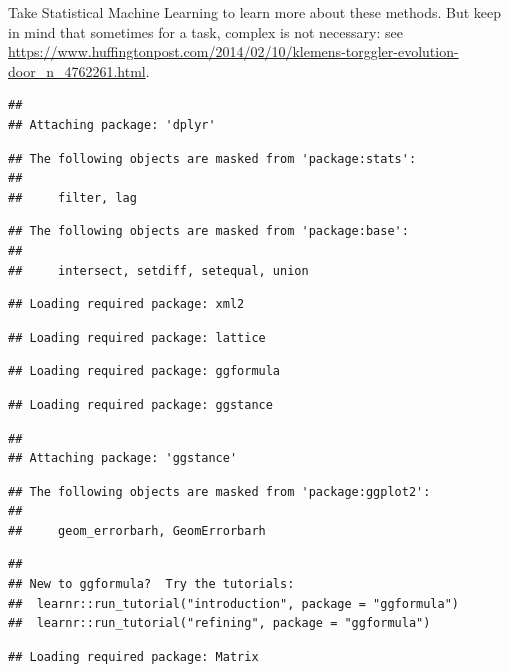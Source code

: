 \documentclass[
]{book}
\begin{document}
Take Statistical Machine Learning to learn more about these methods. But keep in mind that sometimes for a task, complex is not necessary: see \url{https://www.huffingtonpost.com/2014/02/10/klemens-torggler-evolution-door_n_4762261.html}.

\begin{verbatim}
## 
## Attaching package: 'dplyr'
\end{verbatim}

\begin{verbatim}
## The following objects are masked from 'package:stats':
## 
##     filter, lag
\end{verbatim}

\begin{verbatim}
## The following objects are masked from 'package:base':
## 
##     intersect, setdiff, setequal, union
\end{verbatim}

\begin{verbatim}
## Loading required package: xml2
\end{verbatim}

\begin{verbatim}
## Loading required package: lattice
\end{verbatim}

\begin{verbatim}
## Loading required package: ggformula
\end{verbatim}

\begin{verbatim}
## Loading required package: ggstance
\end{verbatim}

\begin{verbatim}
## 
## Attaching package: 'ggstance'
\end{verbatim}

\begin{verbatim}
## The following objects are masked from 'package:ggplot2':
## 
##     geom_errorbarh, GeomErrorbarh
\end{verbatim}

\begin{verbatim}
## 
## New to ggformula?  Try the tutorials: 
## 	learnr::run_tutorial("introduction", package = "ggformula")
## 	learnr::run_tutorial("refining", package = "ggformula")
\end{verbatim}

\begin{verbatim}
## Loading required package: Matrix
\end{verbatim}
\end{document}
